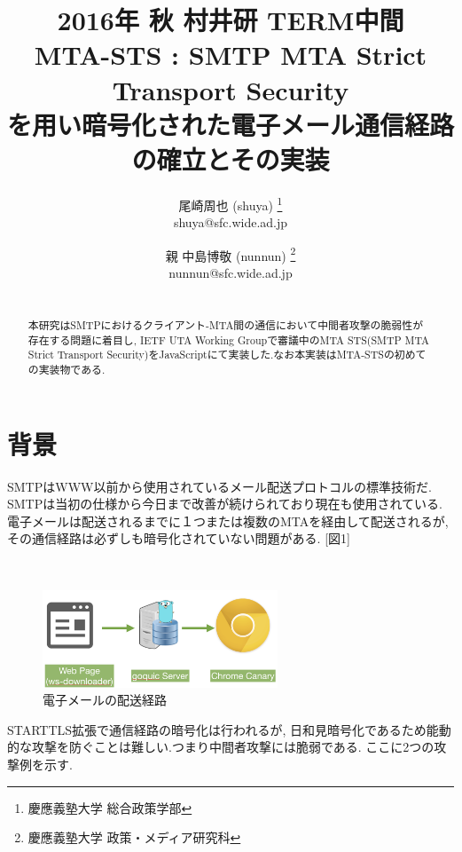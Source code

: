 \documentclass[a4j, 10pt, uplatex]{jsarticle}
\begin{document}

\title{2016年 秋 村井研 TERM中間\\
MTA-STS : SMTP MTA Strict Transport Security
\\を用い暗号化された電子メール通信経路の確立とその実装}

\author{
    尾崎周也 (shuya) \thanks{慶應義塾大学 総合政策学部}
    \\shuya@sfc.wide.ad.jp
    \and
    親 中島博敬 (nunnun) \thanks{慶應義塾大学 政策・メディア研究科}
    \\nunnun@sfc.wide.ad.jp
}


\begin{abstract}
\\
本研究はSMTPにおけるクライアント-MTA間の通信において中間者攻撃の脆弱性が存在する問題に着目し, IETF UTA Working Groupで審議中のMTA STS(SMTP MTA Strict Transport Security)\cite{draft}をJavaScriptにて実装した.なお本実装はMTA-STSの初めての実装物である.
\end{abstract}

\maketitle
\thispagestyle{empty}

\section{背景}

SMTPはWWW以前から使用されているメール配送プロトコルの標準技術だ. SMTPは当初の仕様から今日まで改善が続けられており現在も使用されている. 電子メールは配送されるまでに１つまたは複数のMTAを経由して配送されるが, その通信経路は必ずしも暗号化されていない問題がある. [図1]
\begin{figure}[htbp]
　\begin{center}
      \includegraphics[width=7cm]{figure1.png}
      \caption{電子メールの配送経路}
    \end{center}
\end{figure}

STARTTLS拡張で通信経路の暗号化は行われるが, 日和見暗号化であるため能動的な攻撃を防ぐことは難しい.つまり中間者攻撃には脆弱である. ここに2つの攻撃例を示す.
\end{document}
